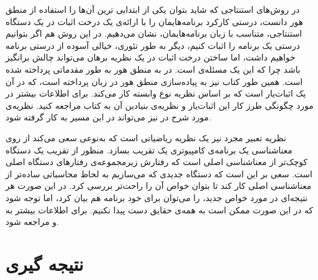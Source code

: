 \documentclass[12pt]{report}
\begin{document}
در روش‌های استنتاجی که شاید بتوان یکی از ابتدایی ترین آن‌ها را استفاده از منطق هور\cite{hoare} دانست، درستی کارکرد برنامه‌هایمان را با ارائه‌ی یک درخت اثبات در یک دستگاه استنتاجی، متناسب با زبان برنامه‌هایمان، نشان می‌‌دهیم. در این روش هم اگر بتوانیم درستی یک برنامه را اثبات کنیم، دیگر به‌ طور تئوری، خیالی آسوده از درستی برنامه خواهیم داشت، اما ساختن درخت اثبات در یک نظریه برهان می‌تواند چالش بر‌انگیز باشد چرا که این یک مسئله‌ی  است. در\cite{logicincs} به منطق هور به طور مقدماتی پرداخته شده است. همین ‌طور کتاب\cite{softwarefoundations} نیز به پیاده‌سازی منطق هور در زبان  پرداخته است، که در آن  یک اثبات‌یار است که بر اساس نظریه نوع وابسته کار می‌کند. برای اطلاعات بیشتر در مورد چگونگی طرز کار این اثبات‌یار و نظریه‌ی بنیادین آن به کتاب\cite{chlipala} مراجعه‌ کنید. نظریه‌ی مورد شرح در\cite{dynamic} نیز می‌تواند در این مسیر به کار گرفته شود.

نظریه تعبیر مجرد\cite{cousot1} نیز یک نظریه ریاضیاتی است که به‌نوعی سعی می‌کند از روی معناشناسی یک برنامه‌ی کامپیوتری\cite{winskel} یک تقریب بسازد. منظور از تقریب یک دستگاه کوچک‌تر از معناشناسی اصلی است که رفتارش زیرمجموعه‌ی رفتارهای دستگاه اصلی است. سعی بر این است که دستگاه جدیدی که می‌سازیم به لحاظ محاسباتی ساده‌تر از معناشناسی اصلی کار کند تا بتوان خواص آن را راحت‌تر بررسی کرد. در این صورت هر نتیجه‌ای در مورد خواص جدید، را می‌توان برای خود برنامه هم بیان کرد، اما توجه شود که در این صورت ممکن است به همه‌ی حقایق دست پیدا نکنیم. برای اطلاعات بیشتر به \cite{cousotbook} و \cite{statica} مراجعه شود.



\tableofcontents







\chapter{نتیجه گیری}

\printglossary


\newpage
\begin{latin}
	
	
\end{latin}
\end{document}

